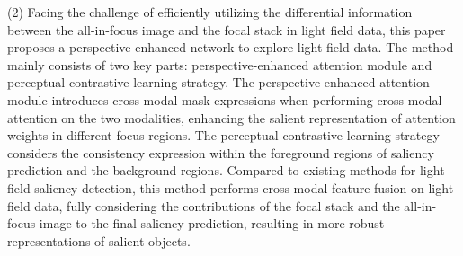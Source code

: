 \begin{englishabstract}
	
(2)
Facing the challenge of efficiently utilizing the differential information between the all-in-focus image and the focal stack in light field data, this paper proposes a perspective-enhanced network to explore light field data. The method mainly consists of two key parts: perspective-enhanced attention module and perceptual contrastive learning strategy. The perspective-enhanced attention module introduces cross-modal mask expressions when performing cross-modal attention on the two modalities, enhancing the salient representation of attention weights in different focus regions. The perceptual contrastive learning strategy considers the consistency expression within the foreground regions of saliency prediction and the background regions. Compared to existing methods for light field saliency detection, this method performs cross-modal feature fusion on light field data, fully considering the contributions of the focal stack and the all-in-focus image to the final saliency prediction, resulting in more robust representations of salient objects. 
	
	
	
\end{englishabstract}






